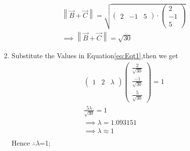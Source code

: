 \documentclass[11pt, a4paper]{article}
\newcommand{\myvec}[1]{\ensuremath{\begin{pmatrix}#1\end{pmatrix}}}
\providecommand{\norm}[1]{\left\lVert#1\right\rVert}
\begin{document}
\begin{enumerate}
\begin{enumerate}
\begin{align}
              \norm{\Vec{B}+\Vec{C}}=\sqrt{\myvec{2&-1&5}\cdot\myvec{2\\-1\\5}}\\
             \implies   \norm{\Vec{B}+\Vec{C}}=\sqrt{30}
          \end{align}
          \item Substitute the Values in Equation\eqref{eq:Eqt1},then we get
          \begin{align}   
                      \myvec{1&2& \lambda}\myvec{\frac{2}{\sqrt{30}} \\ \frac{-1}{\sqrt{30}} \\ \frac{5}{\sqrt{30}}}=1\\
                      \frac{5\lambda}{\sqrt{30}}=1\\       
                     \implies \lambda=1.093151\\
                      \implies \lambda \approx 1\\
          \end{align}
       Hence  $\therefore \lambda$=1;
      \end{enumerate}
   \end{enumerate}
\end{document}
